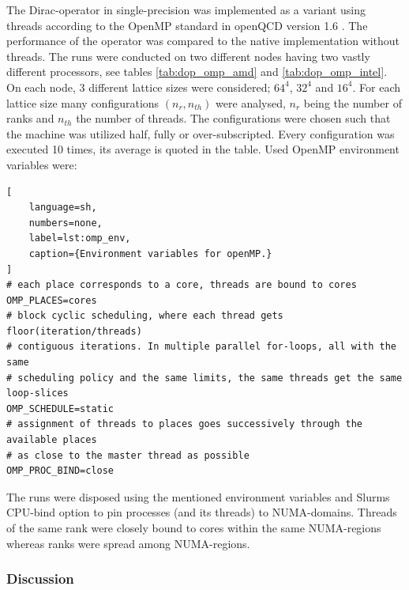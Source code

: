 \documentclass{article}
\theoremstyle{plain} %
\theoremstyle{convention} %
\theoremstyle{remark} %
\numberwithin{equation}{section}
\begin{document}
The Dirac-operator in single-precision was implemented as a variant using threads according to the OpenMP standard in openQCD version 1.6 \cite{openqcd}. The performance of the operator was compared to the native implementation without threads. The runs were conducted on two different nodes having two vastly different processors, see tables \ref{tab:dop_omp_amd} and \ref{tab:dop_omp_intel}. On each node, \num{3} different lattice sizes were considered; $64^4$, $32^4$ and $16^4$. For each lattice size many configurations $(n_r,n_{th})$ were analysed, $n_r$ being the number of ranks and $n_{th}$ the number of threads. The configurations were chosen such that the machine was utilized half, fully or over-subscripted. Every configuration was executed \num{10} times, its average is quoted in the table. Used OpenMP environment variables were:

\begin{lstlisting}[
    language=sh,
    numbers=none,
    label=lst:omp_env,
    caption={Environment variables for openMP.}
]
# each place corresponds to a core, threads are bound to cores
OMP_PLACES=cores
# block cyclic scheduling, where each thread gets floor(iteration/threads)
# contiguous iterations. In multiple parallel for-loops, all with the same
# scheduling policy and the same limits, the same threads get the same loop-slices
OMP_SCHEDULE=static
# assignment of threads to places goes successively through the available places
# as close to the master thread as possible
OMP_PROC_BIND=close
\end{lstlisting}

The runs were disposed using the mentioned environment variables and Slurms CPU-bind option to pin processes (and its threads) to NUMA-domains. Threads of the same rank were closely bound to cores within the same NUMA-regions whereas ranks were spread among NUMA-regions.

\subsubsection{Discussion}
\end{document}
